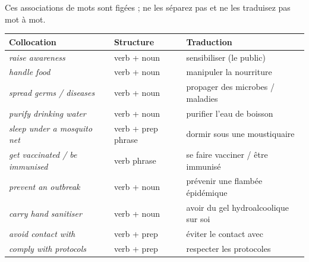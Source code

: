 \documentclass[11pt]{article}
\newcommand{\eng}[1]{\ifmmode\text{\textit{#1}}\else\begingroup\selectlanguage{english}\itshape #1\endgroup\fi}
\begin{document}
\begin{propriete}
Ces associations de mots sont figées ; ne les séparez pas et ne les traduisez pas mot à mot.
\begin{center}
\begin{tabularx}{\linewidth}{|l|l|X|}
\hline
\rowcolor{poporangeL} Collocation & Structure & Traduction \\
\hline
\eng{raise awareness} & verb + noun & sensibiliser (le public) \\
\hline
\eng{handle food} & verb + noun & manipuler la nourriture \\
\hline
\eng{spread germs / diseases} & verb + noun & propager des microbes / maladies \\
\hline
\eng{purify drinking water} & verb + noun & purifier l'eau de boisson \\
\hline
\eng{sleep under a mosquito net} & verb + prep phrase & dormir sous une moustiquaire \\
\hline
\eng{get vaccinated / be immunised} & verb phrase & se faire vacciner / être immunisé \\
\hline
\eng{prevent an outbreak} & verb + noun & prévenir une flambée épidémique \\
\hline
\eng{carry hand sanitiser} & verb + noun & avoir du gel hydroalcoolique sur soi \\
\hline
\eng{avoid contact with} & verb + prep & éviter le contact avec \\
\hline
\eng{comply with protocols} & verb + prep & respecter les protocoles \\
\hline
\end{tabularx}
\end{center}
\end{propriete}
\end{document}
